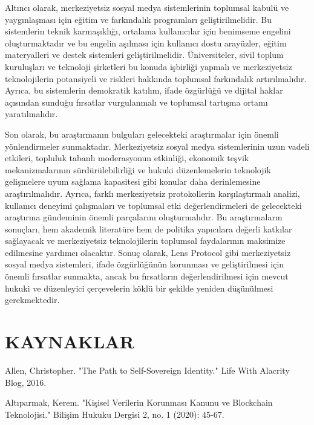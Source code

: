\documentclass[11pt,a4paper]{article}
\begin{document}
Altıncı olarak, merkeziyetsiz sosyal medya sistemlerinin toplumsal kabulü ve yaygınlaşması için eğitim ve farkındalık programları geliştirilmelidir. Bu sistemlerin teknik karmaşıklığı, ortalama kullanıcılar için benimseme engelini oluşturmaktadır ve bu engelin aşılması için kullanıcı dostu arayüzler, eğitim materyalleri ve destek sistemleri geliştirilmelidir. Üniversiteler, sivil toplum kuruluşları ve teknoloji şirketleri bu konuda işbirliği yapmalı ve merkeziyetsiz teknolojilerin potansiyeli ve riskleri hakkında toplumsal farkındalık artırılmalıdır. Ayrıca, bu sistemlerin demokratik katılım, ifade özgürlüğü ve dijital haklar açısından sunduğu fırsatlar vurgulanmalı ve toplumsal tartışma ortamı yaratılmalıdır.

Son olarak, bu araştırmanın bulguları gelecekteki araştırmalar için önemli yönlendirmeler sunmaktadır. Merkeziyetsiz sosyal medya sistemlerinin uzun vadeli etkileri, topluluk tabanlı moderasyonun etkinliği, ekonomik teşvik mekanizmalarının sürdürülebilirliği ve hukuki düzenlemelerin teknolojik gelişmelere uyum sağlama kapasitesi gibi konular daha derinlemesine araştırılmalıdır. Ayrıca, farklı merkeziyetsiz protokollerin karşılaştırmalı analizi, kullanıcı deneyimi çalışmaları ve toplumsal etki değerlendirmeleri de gelecekteki araştırma gündeminin önemli parçalarını oluşturmalıdır. Bu araştırmaların sonuçları, hem akademik literatüre hem de politika yapıcılara değerli katkılar sağlayacak ve merkeziyetsiz teknolojilerin toplumsal faydalarının maksimize edilmesine yardımcı olacaktır. Sonuç olarak, Lens Protocol gibi merkeziyetsiz sosyal medya sistemleri, ifade özgürlüğünün korunması ve geliştirilmesi için önemli fırsatlar sunmakta, ancak bu fırsatların değerlendirilmesi için mevcut hukuki ve düzenleyici çerçevelerin köklü bir şekilde yeniden düşünülmesi gerekmektedir.

\newpage

\section*{\fontsize{12}{14}\selectfont\bfseries KAYNAKLAR}

\fontsize{11}{13}\selectfont
\setlength{\parindent}{0cm}
\setlength{\parskip}{0.5em}

Allen, Christopher. "The Path to Self-Sovereign Identity." Life With Alacrity Blog, 2016.

Altıparmak, Kerem. "Kişisel Verilerin Korunması Kanunu ve Blockchain Teknolojisi." Bilişim Hukuku Dergisi 2, no. 1 (2020): 45-67.
\end{document}
